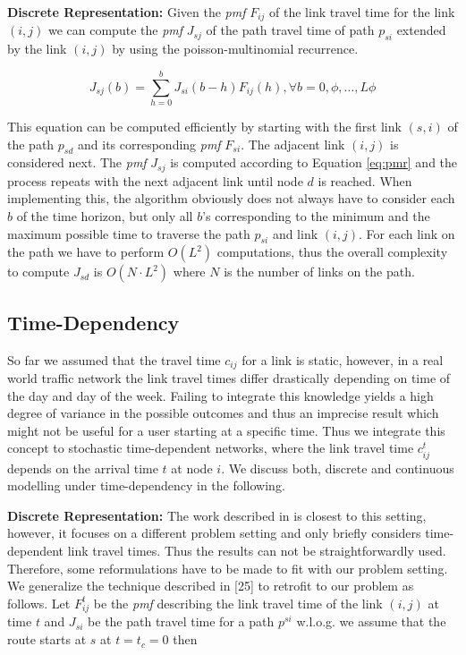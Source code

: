 \textbf{Discrete Representation: } Given the \textit{pmf} $F_{ij}$ of the link travel
time for the link $(i,j)$ we can compute the \textit{pmf} $J_{sj}$ of the path travel time of path $p_{si}$ extended by the link
$(i,j)$ by using the poisson-multinomial recurrence.

\begin{equation}
\label{eq:pmr}
	J_{sj}(b) = \sum_{h=0}^b J_{si}(b-h) F_{ij}(h)  , \forall b = 0, \phi,\ldots, L
	\phi
\end{equation}

This equation can be computed efficiently by starting with the first link
$(s,i)$ of the path $p_{sd}$ and its corresponding \textit{pmf} $F_{si}$. The adjacent
link $(i,j)$ is considered next. The \textit{pmf} $J_{sj}$ is computed according to
Equation \ref{eq:pmr} and the process repeats with the next adjacent link until
node $d$ is reached. When implementing this, the algorithm obviously does not
always have to consider each $b$ of the time horizon, but only all $b$'s corresponding to
the minimum and the maximum possible time to traverse the path $p_{si}$ and link
$(i,j)$. For each link on the path we have to perform $O(L^2)$
computations, thus the overall complexity to compute $J_{sd}$ is $O(N \cdot
L^2)$ where $N$ is the number of links on the path. 

\subsection{Time-Dependency}
\label{subsec:time}
So far we assumed that the travel time $c_{ij}$ for a link is static, however,
in a real world traffic network the link travel times differ drastically
depending on time of the day and day of the week. Failing to integrate this
knowledge yields a high degree of variance in the possible outcomes and thus an
imprecise result which might not be useful for a user starting at a specific
time. Thus we integrate this concept to stochastic time-dependent networks,
where the link travel time $c_{ij}^t$ depends on the arrival time $t$ at node
$i$. We discuss both, discrete and continuous modelling under time-dependency in the following.

\textbf{Discrete Representation: } The work
described in \cite{Nie09b} is closest to this setting, however, it
focuses on a different problem setting and only briefly considers time-dependent
link travel times. Thus the results can not be straightforwardly used.
Therefore, some reformulations have to be made to fit with our problem setting.
We generalize the technique described in [25]  to retrofit to our problem as follows.  
Let $F_{ij}^t$ be the \textit{pmf} describing the link travel time of the link $(i,j)$ at
time $t$ and $J_{si}$ be the path travel time for a path $p^{si}$ w.l.o.g. we
assume that the route starts at $s$ at $t = t_c = 0$ then


